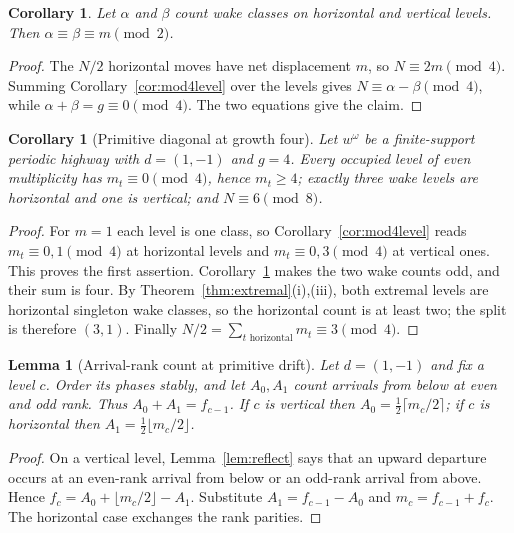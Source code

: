 \documentclass[11pt,letterpaper]{article}
\theoremstyle{plain}
\newtheorem{lemma}[theorem]{Lemma}
\newtheorem{corollary}[theorem]{Corollary}
\theoremstyle{definition}
\newcommand{\drift}{d}
\newcommand{\growth}{g}
\begin{document}
\begin{NoHyper}
\begin{corollary}\label{cor:wakesplit}
Let $\alpha$ and $\beta$ count wake classes on horizontal and vertical levels.
Then $\alpha\equiv\beta\equiv m\pmod2$.
\end{corollary}

\begin{proof}
The $N/2$ horizontal moves have net displacement $m$, so
$N\equiv2m\pmod4$. Summing Corollary~\ref{cor:mod4level} over the levels gives
$N\equiv\alpha-\beta\pmod4$, while
$\alpha+\beta=\growth\equiv0\pmod4$. The two equations give the claim.
\end{proof}

\begin{corollary}[Primitive diagonal at growth four]\label{cor:primg4}
Let $w^\omega$ be a finite-support periodic highway with $\drift=(1,-1)$ and
$\growth=4$. Every occupied level of even multiplicity has
$m_t\equiv0\pmod4$, hence $m_t\ge4$; exactly three wake levels are horizontal and
one is vertical; and $N\equiv6\pmod8$.
\end{corollary}

\begin{proof}
For $m=1$ each level is one class, so Corollary~\ref{cor:mod4level} reads
$m_t\equiv0,1\pmod4$ at horizontal levels and $m_t\equiv0,3\pmod4$ at vertical
ones. This proves the first assertion. Corollary~\ref{cor:wakesplit} makes the two
wake counts odd, and their sum is four. By Theorem~\ref{thm:extremal}(i),(iii),
both extremal levels are horizontal singleton wake classes, so the horizontal count
is at least two; the split is therefore $(3,1)$. Finally
$N/2=\sum_{t\text{ horizontal}}m_t\equiv3\pmod4$.
\end{proof}

\begin{lemma}[Arrival-rank count at primitive drift]\label{lem:arrivalrank}
Let $\drift=(1,-1)$ and fix a level $c$.  Order its phases stably, and let
$A_0,A_1$ count arrivals from below at even and odd rank.  Thus
$A_0+A_1=f_{c-1}$.  If $c$ is vertical then
$A_0=\frac12\lceil m_c/2\rceil$; if $c$ is horizontal then
$A_1=\frac12\lfloor m_c/2\rfloor$.
\end{lemma}

\begin{proof}
On a vertical level, Lemma~\ref{lem:reflect} says that an upward departure occurs
at an even-rank arrival from below or an odd-rank arrival from above.  Hence
$f_c=A_0+\lfloor m_c/2\rfloor-A_1$.  Substitute
$A_1=f_{c-1}-A_0$ and $m_c=f_{c-1}+f_c$.  The horizontal case exchanges the
rank parities.
\end{proof}


\end{NoHyper}
\end{document}
